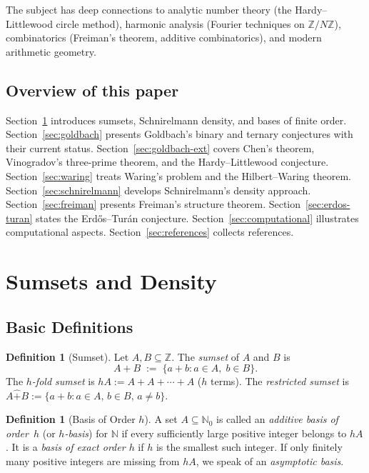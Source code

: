 \documentclass[12pt,a4paper]{amsart}
\theoremstyle{definition}
\newtheorem{definition}[theorem]{Definition}
\newcommand{\N}{\mathbb{N}}
\newcommand{\Z}{\mathbb{Z}}
\begin{document}
The subject has deep connections to analytic number theory
(the Hardy--Littlewood circle method), harmonic analysis (Fourier
techniques on $\Z/N\Z$), combinatorics (Freiman's theorem, additive
combinatorics), and modern arithmetic geometry.

\subsection*{Overview of this paper}

Section~\ref{sec:sumsets} introduces sumsets, Schnirelmann density, and
bases of finite order.  Section~\ref{sec:goldbach} presents Goldbach's
binary and ternary conjectures with their current status.
Section~\ref{sec:goldbach-ext} covers Chen's theorem, Vinogradov's
three-prime theorem, and the Hardy--Littlewood conjecture.
Section~\ref{sec:waring} treats Waring's problem and the Hilbert--Waring
theorem.  Section~\ref{sec:schnirelmann} develops Schnirelmann's density
approach.  Section~\ref{sec:freiman} presents Freiman's structure theorem.
Section~\ref{sec:erdos-turan} states the Erd\H{o}s--Tur\'{a}n conjecture.
Section~\ref{sec:computational} illustrates computational aspects.
Section~\ref{sec:references} collects references.

\section{Sumsets and Density}\label{sec:sumsets}

\subsection{Basic Definitions}

\begin{definition}[Sumset]
Let $A, B \subseteq \Z$.  The \emph{sumset} of $A$ and $B$ is
\[
  A + B \;:=\; \{ a + b : a \in A,\; b \in B \}.
\]
The \emph{$h$-fold sumset} is $hA := A + A + \cdots + A$ ($h$ terms).
The \emph{restricted sumset} is
$A \hat{+} B := \{a + b : a \in A,\, b \in B,\, a \neq b\}$.
\end{definition}

\begin{definition}[Basis of Order $h$]\label{def:basis}
A set $A \subseteq \N_0$ is called an \emph{additive basis of order~$h$}
(or \emph{$h$-basis}) for $\N$ if every sufficiently large positive
integer belongs to $hA$.  It is a \emph{basis of exact order $h$} if
$h$ is the smallest such integer.  If only finitely many positive
integers are missing from $hA$, we speak of an \emph{asymptotic basis}.
\end{definition}
\end{document}
